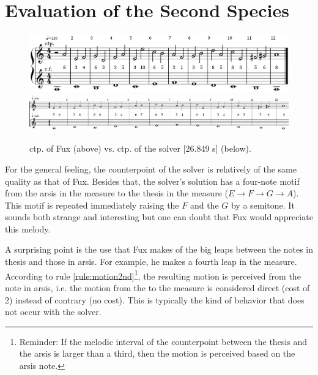 \section{Evaluation of the Second Species}
\begin{figure}[h]
    \centering
    \includegraphics[height=\fh]{Images/the_second_species.png}
    \includegraphics[width=\textwidth, height=\fhs]{Images/solver_2sp.png}
    \caption{ ctp. of Fux (above) vs. ctp. of the solver [26.849 s] (below).}
    \label{fig:eval_2sp}
\end{figure}
For the general feeling, the counterpoint of the solver is relatively of the same quality as that of Fux. Besides that, the solver's solution has a four-note motif from the arsis in the  measure to the thesis in the  measure ($E\to F\to G\to A$). This motif is repeated immediately raising the $F$ and the $G$ by a semitone. It sounds both strange and interesting but one can doubt that Fux would appreciate this melody.

A surprising point is the use that Fux makes of the big leaps between the notes in thesis and those in arsis. For example, he makes a fourth leap in the  measure. According to rule \ref{rule:motion2nd}\footnote{Reminder: If the melodic interval of the counterpoint between the thesis and the arsis is larger than a third, then the motion is perceived based on the arsis note.}, the resulting motion is perceived from the note in arsis, i.e. the motion from the  to the  measure is considered direct (cost of 2) instead of contrary (no cost). This is typically the kind of behavior that does not occur with the solver.

